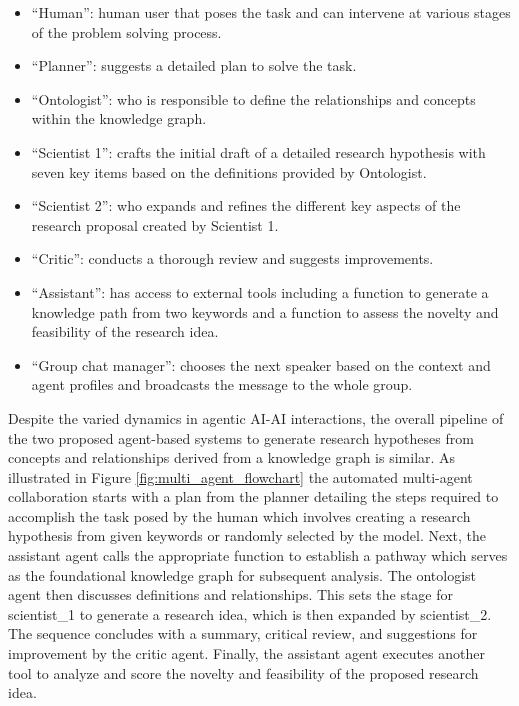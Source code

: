 \documentclass{article}
\begin{document}
\begin{itemize}
    \item ``Human'': human user that poses the task and can intervene at various stages of the problem solving process.
    \item ``Planner'': suggests a detailed plan to solve the task.
    \item ``Ontologist'': who is responsible to define the relationships and concepts within the knowledge graph.
    \item ``Scientist 1'': crafts the initial draft of a detailed research hypothesis with seven key items based on the definitions provided by Ontologist. 
    \item ``Scientist 2'': 
    who expands and refines the different key aspects of the research proposal created by Scientist 1. 
    \item ``Critic'': conducts a thorough review and suggests improvements. 
    \item ``Assistant'': has access to external tools including a function to generate a knowledge path from two keywords and a function to assess the novelty and feasibility of the research idea. 
    \item ``Group chat manager'': chooses the next speaker based on the context and agent profiles and broadcasts the message to the whole group.
\end{itemize}

Despite the varied dynamics in agentic AI-AI interactions, the overall pipeline of the two proposed agent-based systems to generate research hypotheses from concepts and relationships derived from a knowledge graph is similar. As illustrated in Figure \ref{fig:multi_agent_flowchart} the automated multi-agent collaboration starts with a plan from the planner detailing the steps required to accomplish the task posed by the human which involves creating a research hypothesis from given keywords or randomly selected by the model. Next, the assistant agent calls the appropriate function to establish a pathway which serves as the foundational knowledge graph for subsequent analysis. The ontologist agent then discusses definitions and relationships. This sets the stage for scientist\_1 to generate a research idea, which is then expanded by scientist\_2. The sequence concludes with a summary, critical review, and suggestions for improvement by the critic agent. Finally, the assistant agent executes another tool to analyze and score the novelty and feasibility of the proposed research idea. 
\end{document}
